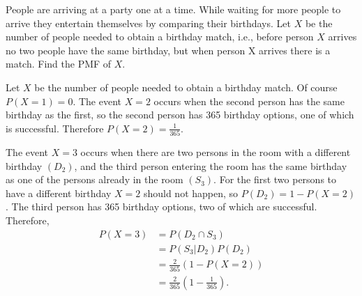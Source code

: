 

\setcounter{theorem}{0}

\begin{exercise}[BH.3.1]
People are arriving at a party one at a time. While waiting for more people to arrive they entertain themselves by comparing their birthdays. Let $X$ be the number of people needed to obtain a birthday match, i.e., before person $X$ arrives no two people have the same birthday, but when person X arrives there is a match. Find the PMF of $X$.
	\begin{solution}
	Let $X$ be the number of people needed to obtain a birthday match. Of course $P(X=1)=0$. The event $X=2$ occurs when the second person has the same birthday as the first, so the second person has 365 birthday options, one of which is successful. Therefore $P(X=2)=\frac{1}{365}$. 

	The event $X=3$ occurs when there are two persons in the room with a different birthday $(D_{2})$, and the third person entering the room has the same birthday as one of the persons already in the room $(S_3)$. For the first two persons to have a different birthday $X=2$ should not happen, so $P(D_{2})=1-P(X=2)$. The third person has 365 birthday options, two of which are successful. Therefore,
	\begin{align*}
		P(X=3) &= P(D_{2} \cap S_{3})\\
		& = P(S_{3}|D_{2})P(D_{2})\\
		& = \frac{2}{365}(1-P(X=2))\\
		& = \frac{2}{365}\left(1-\frac{1}{365}\right).
	\end{align*}


\end{solution}
\end{exercise}
